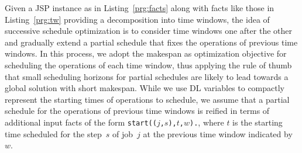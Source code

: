 \documentclass{tlp} %
\begin{document}
Given a JSP instance as in Listing~\ref{prg:facts} along with facts like those
in Listing~\ref{prg:tw} providing a decomposition into time windows,
the idea of successive schedule optimization is to consider time windows
one after the other and gradually extend a partial schedule that fixes the
operations of previous time windows.
In this process, we adopt the makespan as optimization objective for scheduling
the operations of each time window,
thus applying the rule of thumb that small scheduling horizons for
partial schedules are likely to lead towards a global solution with short makespan.
While we use DL variables to compactly represent the starting times of operations to schedule,
we assume that a partial schedule for the operations of previous time windows is reified
in terms of additional input facts of the form 
\lstinline{start((}$j$\lstinline{,}$s$\lstinline{),}$t$\lstinline{,}$w$\lstinline{).},
where $t$ is the starting time scheduled for the step~$s$ of job~$j$ at the previous
time window indicated by~$w$.
\end{document}
